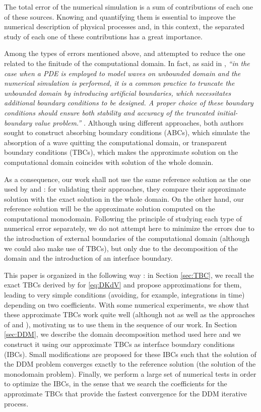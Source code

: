 \indent The total error of the numerical simulation is a sum of contributions of each one of these sources. Knowing and quantifying them is essential to improve the numerical description of physical processes and, in this context, the separated study of each one of these contributions has a great importance.

\indent Among the types of errors mentioned above, \cite{zheng2008} and \cite{besse2015} attempted to reduce the one related to the finitude of the computational domain. In fact, as said in \cite{zheng2008}, \emph{``in the case when a PDE is employed to model waves on unbounded domain and the numerical simulation is performed, it is a common practice to truncate the unbounded domain by introducing artificial boundaries, which necessitates additional boundary conditions to be designed. A proper choice of these boundary conditions should ensure both stability and accuracy of the truncated initial-boundary value problem.''} . Although using different approaches, both authors sought to construct absorbing boundary conditions (ABCs), which simulate the absorption of a wave quitting the computational domain, or transparent boundary conditions (TBCs), which makes the approximate solution on the computational domain coincides with solution of the whole domain.

\indent As a consequence, our work shall not use the same reference solution as the one used by \cite{zheng2008} and \cite{besse2015} : for validating their approaches,  they compare their approximate solution with the exact solution in the whole domain. On the other hand, our reference solution will be the approximate solution computed on the computational monodomain. Following the principle of studying each type of numerical error separately, we do not attempt here to minimize the errors due to the introduction of external boundaries of the computational domain (although we could also make use of TBCs), but only due to the decomposition of the domain and the introduction of an interface boundary.

\indent This paper is organized in the following way : in Section \ref{sec:TBC}, we recall the exact TBCs derived by \cite{zheng2008} for \eqref{eq:DKdV} and propose approximations for them, leading to very simple conditions (avoiding, for example, integrations in time) depending on two coefficients. With some numerical experiments, we show that these approximate TBCs work quite well (although not as well as the approaches of \cite{zheng2008} and \cite{besse2015}), motivating us to use them in the sequence of our work. In Section \ref{sec:DDM}, we describe the domain decomposition method used here and we construct it using our approximate TBCs as interface boundary conditions (IBCs). Small modifications are proposed for these IBCs such that the solution of the DDM problem converges exactly to the reference solution (the solution of the monodomain problem). Finally, we perform a large set of numerical tests in order to optimize the IBCs, in the sense that we search the coefficients for the approximate TBCs that provide the fastest convergence for the DDM iterative process.